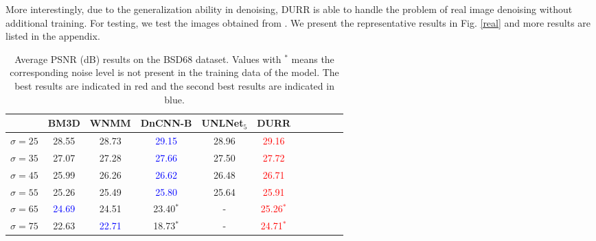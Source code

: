 \documentclass{article} %
\newcommand{\red}[1]{\textcolor{red}{#1}}
\newcommand{\blue}[1]{\textcolor{blue}{#1}}
\begin{document}
More interestingly, due to the generalization ability in denoising, DURR
is able to handle the problem of real image denoising without
additional training. For testing, we test the images obtained
from \cite{lebrun2015noise}. We present the representative results
in Fig. \ref{real} and more results are listed in the appendix.

\begin{table}[ht]
	\centering
	\caption{Average PSNR (dB) results on the BSD68 dataset.
		Values with $^*$ means the corresponding noise level is not present in
		the training data of the model. The best results are indicated in red and the second best results are indicated in blue.}
	\label{sample-table}
	
	\begin{tabular}{l|cccccccccc}
		\toprule
		&BM3D
		&WNMM
		&DnCNN-B
		&UNLNet$_5$
		&DURR \\
		\midrule\midrule
		$\sigma = 25$ & 28.55        & 28.73        & \blue{29.15} & 28.96 & \red{29.16}     \\
		$\sigma = 35$ & 27.07        & 27.28        & \blue{27.66} & 27.50 & \red{27.72}     \\
		$\sigma = 45$ & 25.99        & 26.26        & \blue{26.62} & 26.48 & \red{26.71}     \\
		$\sigma = 55$ & 25.26        & 25.49        & \blue{25.80} & 25.64 & \red{25.91}     \\
		$\sigma = 65$ & \blue{24.69} & 24.51        & 23.40$^*$    & -     & \red{25.26$^*$} \\
		$\sigma = 75$ & 22.63        & \blue{22.71} & 18.73$^*$    & -     & \red{24.71$^*$} \\
		\bottomrule
	\end{tabular}
\end{table}
\end{document}
